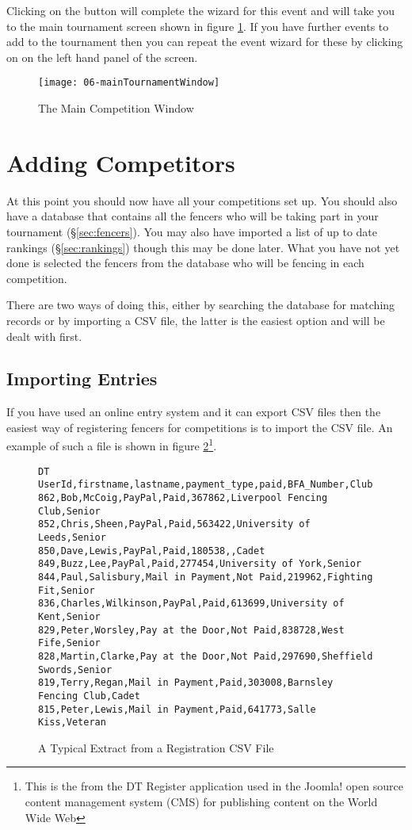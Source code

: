 \documentclass[a4paper,11pt]{memoir}
\begin{document}
Clicking on the  button will complete the wizard for this event and will take you to the main tournament screen shown in figure \ref{fig:06-mainTournamentWindow}. If you have further events to add to the tournament then you can repeat the event wizard for these by clicking on  on the left hand panel of the screen.

\begin{figure}[!ht]
 \centering
 \texttt{[image: 06-mainTournamentWindow]}
 \caption{The Main Competition Window} \label{fig:06-mainTournamentWindow}
\end{figure}

\section{Adding Competitors}
At this point you should now have all your competitions set up. You should also have a database that contains all the fencers who will be taking part in your tournament (\S\ref{sec:fencers}). You may also have imported a list of up to date rankings (\S\ref{sec:rankings}) though this may be done later. What you have not yet done is selected the fencers from the database who will be fencing in each competition. 

There are two ways of doing this, either by searching the database for matching records or by importing a CSV file, the latter is the easiest option and will be dealt with first.

\subsection{Importing Entries}

If you have used an online entry system and it can export CSV files then the easiest way of registering fencers for competitions is to import the CSV file. An example of such a file is shown in figure \ref{fig:06-registrationFile}\footnote{This is the from the DT Register application used in the Joomla! open source content management system (CMS) for publishing content on the World Wide Web}.

\begin{figure}[!ht]
 \begin{verbatim}
DT UserId,firstname,lastname,payment_type,paid,BFA_Number,Club,Age_Group
862,Bob,McCoig,PayPal,Paid,367862,Liverpool Fencing Club,Senior
852,Chris,Sheen,PayPal,Paid,563422,University of Leeds,Senior
850,Dave,Lewis,PayPal,Paid,180538,,Cadet
849,Buzz,Lee,PayPal,Paid,277454,University of York,Senior
844,Paul,Salisbury,Mail in Payment,Not Paid,219962,Fighting Fit,Senior
836,Charles,Wilkinson,PayPal,Paid,613699,University of Kent,Senior
829,Peter,Worsley,Pay at the Door,Not Paid,838728,West Fife,Senior
828,Martin,Clarke,Pay at the Door,Not Paid,297690,Sheffield Swords,Senior
819,Terry,Regan,Mail in Payment,Paid,303008,Barnsley Fencing Club,Cadet
815,Peter,Lewis,Mail in Payment,Paid,641773,Salle Kiss,Veteran
 \end{verbatim}
 \caption{A Typical Extract from a Registration CSV File}\label{fig:06-registrationFile}
\end{figure}
\end{document}
